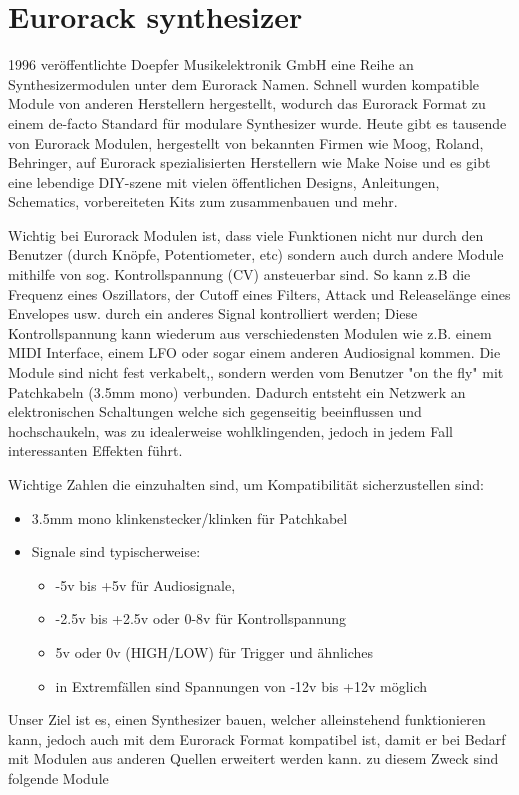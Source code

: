 \documentclass[11pt]{article}
\date{\today}
\title{}
\begin{document}
\section*{Eurorack synthesizer}
\label{sec:org836c237}
1996 veröffentlichte Doepfer Musikelektronik GmbH eine Reihe an Synthesizermodulen unter dem Eurorack Namen. Schnell wurden kompatible Module von anderen Herstellern hergestellt, wodurch das Eurorack Format zu einem de-facto Standard für modulare Synthesizer wurde. Heute gibt es tausende von Eurorack Modulen, hergestellt von bekannten Firmen wie Moog, Roland, Behringer, auf Eurorack spezialisierten Herstellern wie Make Noise und es gibt eine lebendige DIY-szene mit vielen öffentlichen Designs, Anleitungen, Schematics, vorbereiteten Kits zum zusammenbauen und mehr.

Wichtig bei Eurorack Modulen ist, dass viele Funktionen nicht nur durch den Benutzer (durch Knöpfe, Potentiometer, etc) sondern auch durch andere Module mithilfe von sog. Kontrollspannung
(CV) ansteuerbar sind. So kann z.B die Frequenz eines Oszillators, der Cutoff eines Filters, Attack und Releaselänge eines Envelopes usw. durch ein anderes Signal kontrolliert werden; Diese Kontrollspannung kann wiederum aus verschiedensten Modulen wie z.B. einem MIDI Interface, einem LFO oder sogar einem anderen Audiosignal kommen. Die Module sind nicht fest verkabelt,, sondern werden vom Benutzer "on the fly" mit Patchkabeln (3.5mm mono) verbunden. Dadurch entsteht ein Netzwerk
an elektronischen Schaltungen welche sich gegenseitig beeinflussen und hochschaukeln, was zu idealerweise wohlklingenden, jedoch in jedem Fall interessanten Effekten führt.

Wichtige Zahlen die einzuhalten sind, um Kompatibilität sicherzustellen sind:
\begin{itemize}
\item 3.5mm mono klinkenstecker/klinken für Patchkabel
\item Signale sind typischerweise:
\begin{itemize}
\item -5v bis +5v für Audiosignale,
\item -2.5v bis +2.5v oder 0-8v für Kontrollspannung
\item 5v oder 0v (HIGH/LOW) für Trigger und ähnliches
\item in Extremfällen sind Spannungen von -12v bis +12v möglich
\end{itemize}
\end{itemize}

Unser Ziel ist es, einen Synthesizer bauen, welcher alleinstehend funktionieren kann, jedoch auch mit dem Eurorack Format kompatibel ist, damit er bei Bedarf mit Modulen aus anderen Quellen erweitert werden kann. zu diesem Zweck sind folgende Module
\end{document}
